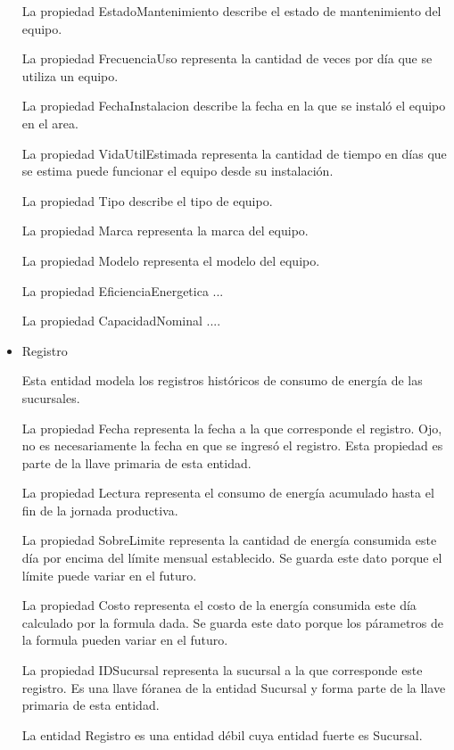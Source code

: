 \documentclass{article}
\begin{document}
\begin{itemize}
La propiedad EstadoMantenimiento describe el estado de mantenimiento del equipo.

La propiedad FrecuenciaUso representa la cantidad de veces por día que se utiliza un equipo.

La propiedad FechaInstalacion describe la fecha en la que se instaló el equipo en el area.

La propiedad VidaUtilEstimada representa la cantidad de tiempo en días que se estima puede funcionar el equipo desde su instalación.

La propiedad Tipo describe el tipo de equipo.

La propiedad Marca representa la marca del equipo.

La propiedad Modelo representa el modelo del equipo.

La propiedad EficienciaEnergetica ...

La propiedad CapacidadNominal ....

\item Registro

Esta entidad modela los registros históricos de consumo de energía de las sucursales.

La propiedad Fecha representa la fecha a la que corresponde el registro. Ojo, no es necesariamente la fecha en que se ingresó el registro. Esta propiedad es parte de la llave primaria de esta entidad.

La propiedad Lectura representa el consumo de energía acumulado hasta el fin de la jornada productiva.

La propiedad SobreLimite representa la cantidad de energía consumida este día por encima del límite mensual establecido. Se guarda este dato porque el límite puede variar en el futuro.

La propiedad Costo representa el costo de la energía consumida este día calculado por la formula dada. Se guarda este dato porque los párametros de la formula pueden variar en el futuro.

La propiedad IDSucursal representa la sucursal a la que corresponde este registro. Es una llave fóranea de la entidad Sucursal y forma parte de la llave primaria de esta entidad.

La entidad Registro es una entidad débil cuya entidad fuerte es Sucursal.
\end{itemize}
\end{document}

